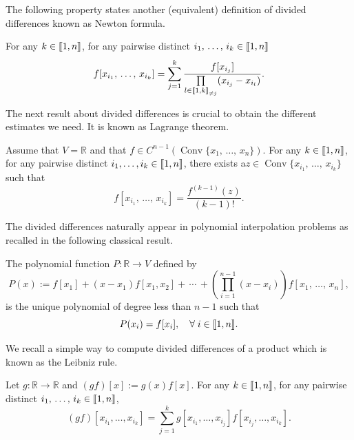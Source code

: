 \documentclass[AHL,Unicode,longabstracts]{cedram}
\DeclareMathOperator{\Conv}{Conv}
\newcommand{\llbracket}{\mathopen{[\mkern -2.7mu[}}
\newcommand{\rrbracket}{\mathclose{]\mkern -2.7mu]}}
\newcommand{\inter}[2]{\llbracket #1,#2 \rrbracket}
\newcommand{\interexclu}[3]{\llbracket #1,#2\rrbracket_{\neq #3}}
\newcommand{\R}{\mathbb{R}}
\let\oldforall\forall
\renewcommand*{\forall}{\mathrel{\oldforall}}
\begin{document}
The following property states another (equivalent) definition of divided differences known as Newton formula.

\begin{prop}\label{Prop:DifferencesDiviseesNewton}
For any $k \in \inter{1}{n}$, for any pairwise distinct $i_1,\,\dots,\,i_k \linebreak \in \inter{1}{n}$
\[
f[x_{i_1},\,\dots,\,x_{i_k}] = \sum_{j=1}^k \frac{f[x_{i_j}]}{\prod\limits_{l\in \interexclu{1}{k}{j}} (x_{i_j}- x_{i_l})}.
\]
\end{prop}

The next result about divided differences is crucial to obtain the different estimates we need. It is known as Lagrange theorem.

\begin{prop}\label{Prop:DifferencesDiviseesLagrange}
Assume that $V\!=\!\R$ and that $f \in C^{n-1} \left(\Conv \{ x_1,\,\dots,\,x_n \} \right)$. For any $k \in \inter{1}{n}$, for any pairwise distinct $i_1, \dots, i_k \in \inter{1}{n} $, there exists a\linebreak$z \in \Conv \{ x_{i_1},\,\dots,\,x_{i_k} \}$ such that
\[
f[x_{i_1},\,\dots,\,x_{i_k}] = \frac{f^{(k-1)}(z)}{(k-1)!}.
\]
\end{prop}


The divided differences naturally appear in polynomial interpolation problems as recalled in the following classical result.
\begin{prop}
The polynomial function $P:\R\to V$ defined by
\begin{equation}\label{lagrange_poly}
P(x) := f[x_1] + (x-x_1) f[x_1,x_2] +\,\dotsm \,+ \left(\prod_{i=1}^{n-1} (x-x_i) \right) f[x_1,\,\dotsc,\,x_n],
\end{equation}
is the unique polynomial of degree less than $n-1$ such that
\begin{equation}\label{interpolation_property}
P(x_i)=f[x_i], \quad \forall i\in \inter{1}{n}.
\end{equation}
\end{prop}

We recall a simple way to compute divided differences of a product which is known as the Leibniz rule.

\begin{prop}\label{Prop:DifferencesDiviseesLeibniz}
Let $g : \R \to \R$ and $(gf)[x] := g(x) f[x]$. For any $k \in \inter{1}{n}$, for any pairwise distinct $i_1,\,\dots,\,i_k \in \inter{1}{n}$,
\[
(gf)[x_{i_1}, \dots, x_{i_k}] = \sum_{j=1}^k g[x_{i_1}, \dots, x_{i_j}] f[x_{i_j}, \dots, x_{i_k}].
\]
\end{prop}
\end{document}
